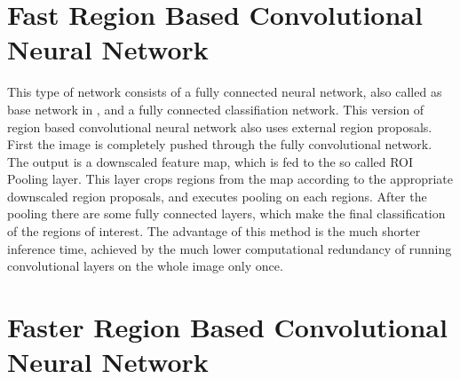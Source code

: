 \section{Fast Region Based Convolutional Neural Network}
This type of network \cite{Girshick:2016:RCN:2881668.2882239} consists of a fully connected neural network, also called as base network in \citep{journals/corr/SermanetEZMFL13}, and a fully connected classifiation network. This version of region based convolutional neural network also uses external region proposals. First the image is completely pushed through the fully convolutional network. The output is a downscaled feature map, which is fed to the so called ROI Pooling layer. This layer crops regions from the map according to the appropriate downscaled region proposals, and executes pooling on each regions. After the pooling there are some fully connected layers, which make the final classification of the regions of interest. The advantage of this method is the much shorter inference time, achieved by the much lower computational redundancy of running convolutional layers on the whole image only once.

\section{Faster Region Based Convolutional Neural Network}
\cite{NIPS2015_5638}